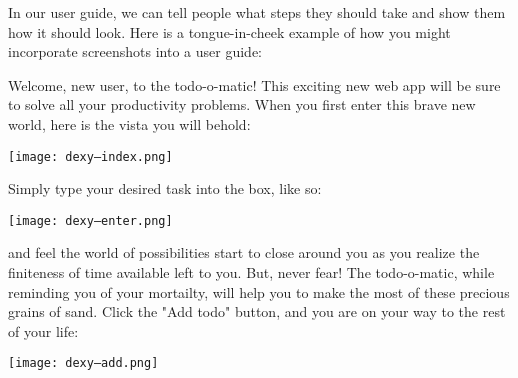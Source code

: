 \documentclass[a4paper]{tufte-handout}
\begin{document}
In our user guide, we can tell people what steps they should take and show them how it should look. Here is a tongue-in-cheek example of how you might incorporate screenshots into a user guide:

\sffamily

Welcome, new user, to the todo-o-matic! This exciting new web app will be sure to solve all your productivity problems. When you first enter this brave new world, here is the vista you will behold:

\texttt{[image: dexy--index.png]}

Simply type your desired task into the box, like so:

\texttt{[image: dexy--enter.png]}

and feel the world of possibilities start to close around you as you realize the finiteness of time available left to you. But, never fear! The todo-o-matic, while reminding you of your mortailty, will help you to make the most of these precious grains of sand. Click the "Add todo" button, and you are on your way to the rest of your life:

\texttt{[image: dexy--add.png]}
\end{document}
